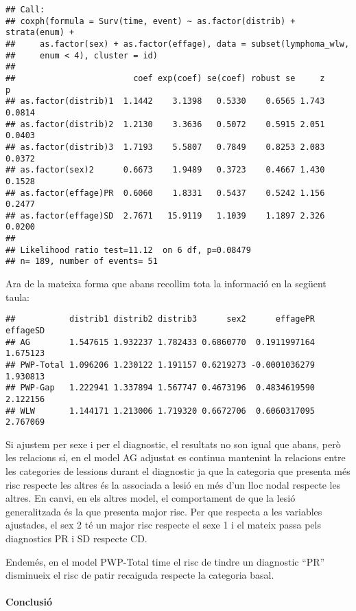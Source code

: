 \documentclass[
]{article}
\begin{document}
\begin{verbatim}
## Call:
## coxph(formula = Surv(time, event) ~ as.factor(distrib) + strata(enum) + 
##     as.factor(sex) + as.factor(effage), data = subset(lymphoma_wlw, 
##     enum < 4), cluster = id)
## 
##                        coef exp(coef) se(coef) robust se     z      p
## as.factor(distrib)1  1.1442    3.1398   0.5330    0.6565 1.743 0.0814
## as.factor(distrib)2  1.2130    3.3636   0.5072    0.5915 2.051 0.0403
## as.factor(distrib)3  1.7193    5.5807   0.7849    0.8253 2.083 0.0372
## as.factor(sex)2      0.6673    1.9489   0.3723    0.4667 1.430 0.1528
## as.factor(effage)PR  0.6060    1.8331   0.5437    0.5242 1.156 0.2477
## as.factor(effage)SD  2.7671   15.9119   1.1039    1.1897 2.326 0.0200
## 
## Likelihood ratio test=11.12  on 6 df, p=0.08479
## n= 189, number of events= 51
\end{verbatim}

Ara de la mateixa forma que abans recollim tota la informació en la
següent taula:

\begin{verbatim}
##           distrib1 distrib2 distrib3      sex2      effagePR effageSD
## AG        1.547615 1.932237 1.782433 0.6860770  0.1911997164 1.675123
## PWP-Total 1.096206 1.230122 1.191157 0.6219273 -0.0001036279 1.930813
## PWP-Gap   1.222941 1.337894 1.567747 0.4673196  0.4834619590 2.122156
## WLW       1.144171 1.213006 1.719320 0.6672706  0.6060317095 2.767069
\end{verbatim}

Si ajustem per sexe i per el diagnostic, el resultats no son igual que
abans, però les relacions sí, en el model AG adjustat es continua
mantenint la relacions entre les categories de lessions durant el
diagnostic ja que la categoria que presenta més risc respecte les altres
és la associada a lesió en més d'un lloc nodal respecte les altres. En
canvi, en els altres model, el comportament de que la lesió
generalitzada és la que presenta major risc. Per que respecta a les
variables ajustades, el sex 2 té un major risc respecte el sexe 1 i el
mateix passa pels diagnostics PR i SD respecte CD.

Endemés, en el model PWP-Total time el risc de tindre un diagnostic
``PR'' disminueix el risc de patir recaiguda respecte la categoria
basal.

\paragraph{Conclusió}\label{conclusiuxf3}
\end{document}
